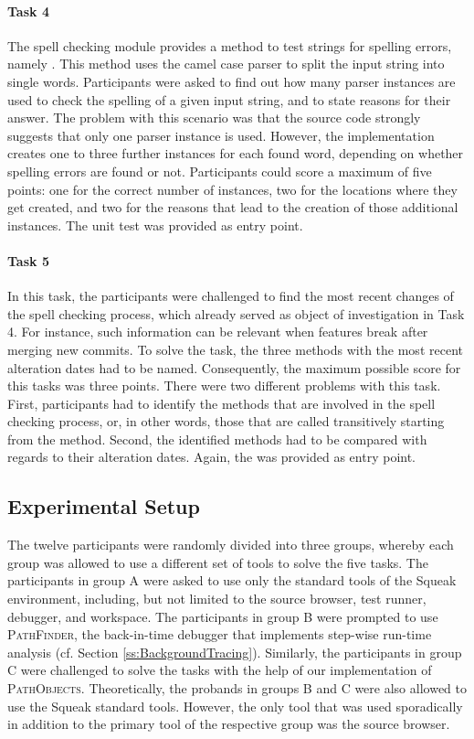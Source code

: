 \paragraph{Task 4} The spell checking module provides a method to test strings for spelling errors, namely .
This method uses the camel case parser to split the input string into single words.
Participants were asked to find out how many parser instances are used to check the spelling of a given input string, and to state reasons for their answer.
The problem with this scenario was that the source code strongly suggests that only one parser instance is used.
However, the implementation creates one to three further instances for each found word, depending on whether spelling errors are found or not.
Participants could score a maximum of five points: one for the correct number of instances, two for the locations where they get created, and two for the reasons that lead to the creation of those additional instances.
The unit test  was provided as entry point.

\paragraph{Task 5} In this task, the participants were challenged to find the most recent changes of the spell checking process, which already served as object of investigation in Task 4.
For instance, such information can be relevant when features break after merging new commits.
To solve the task, the three methods with the most recent alteration dates had to be named.
Consequently, the maximum possible score for this tasks was three points.
There were two different problems with this task.
First, participants had to identify the methods that are involved in the spell checking process, or, in other words, those that are called transitively starting from the  method.
Second, the identified methods had to be compared with regards to their alteration dates.
Again, the  was provided as entry point.


\subsection{Experimental Setup}
The twelve participants were randomly divided into three groups, whereby each group was allowed to use a different set of tools to solve the five tasks.
The participants in group A were asked to use only the standard tools of the Squeak environment, including, but not limited to the source browser, test runner, debugger, and workspace.
The participants in group B were prompted to use \textsc{PathFinder}, the back-in-time debugger that implements step-wise run-time analysis (cf. Section \ref{ss:BackgroundTracing}).
Similarly, the participants in group C were challenged to solve the tasks with the help of our implementation of \textsc{PathObjects}.
Theoretically, the probands in groups B and C were also allowed to use the Squeak standard tools.
However, the only tool that was used sporadically in addition to the primary tool of the respective group was the source browser.

